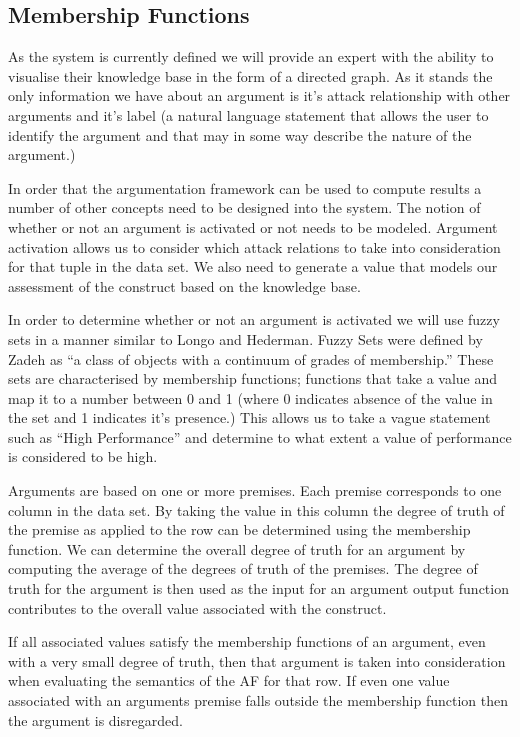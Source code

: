\subsection{Membership Functions}

As the system is currently defined we will provide an expert with the ability to visualise their knowledge base in the form of a directed graph. As it stands the only information we have about an argument is it's attack relationship with other arguments and it's label (a natural language statement that allows the user to identify the argument and that may in some way describe the nature of the argument.) 

In order that the argumentation framework can be used to compute results a number of other concepts need to be designed into the system. The notion of whether or not an argument is activated or not needs to be modeled. Argument activation allows us to consider which attack relations to take into consideration for that tuple in the data set. We also need to generate a value that models our assessment of the construct based on the knowledge base.

In order to determine whether or not an argument is activated we will use fuzzy sets in a manner similar to Longo and Hederman. Fuzzy Sets were defined by Zadeh as ``a class of objects with a continuum of grades of membership.''\cite{zadeh1965fuzzy} These sets are characterised by membership functions; functions that take a value and map it to a number between 0 and 1 (where 0 indicates absence of the value in the set and 1 indicates it's presence.) This allows us to take a vague statement such as ``High Performance'' and determine to what extent a value of performance is considered to be high.

Arguments are based on one or more premises. Each premise corresponds to one column in the data set. By taking the value in this column the degree of truth of the premise as applied to the row can be determined using the membership function. We can determine the overall degree of truth for an argument by computing the average of the degrees of truth of the premises. The degree of truth for the argument is then used as the input for an argument output function contributes to the overall value associated with the construct.

If all associated values satisfy the membership functions of an argument, even with a very small degree of truth, then that argument is taken into consideration when evaluating the semantics of the AF for that row. If even one value associated with an arguments premise falls outside the membership function then the argument is disregarded.

